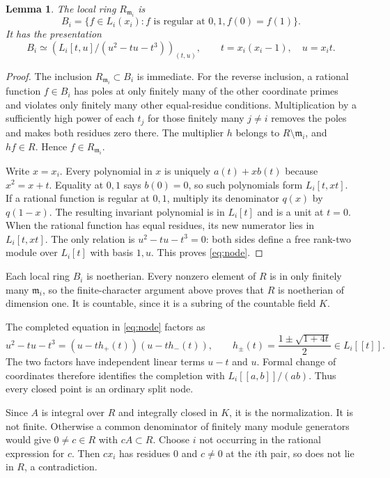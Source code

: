 \documentclass[11pt]{article}
\newtheorem{lemma}[theorem]{Lemma}
\theoremstyle{definition}\newtheorem{definition}[theorem]{Definition}
\theoremstyle{remark}\newtheorem{remark}[theorem]{Remark}
\begin{document}
\begin{lemma}\label{lem:nodal-local}
The local ring $R_{\mathfrak m_i}$ is
\[
 B_i=\{f\in L_i(x_i):f\text{ is regular at }0,1, f(0)=f(1)\}.
\]
It has the presentation
\begin{equation}\label{eq:node}
 B_i\simeq
 \left(L_i[t,u]/(u^2-tu-t^3)\right)_{(t,u)},
 \qquad t=x_i(x_i-1),\quad u=x_i t.
\end{equation}
\end{lemma}
\begin{proof}
The inclusion $R_{\mathfrak m_i}\subset B_i$ is immediate. For the reverse inclusion, a rational function $f\in B_i$ has poles at only finitely many of the other coordinate primes and violates only finitely many other equal-residue conditions. Multiplication by a sufficiently high power of each $t_j$ for those finitely many $j\ne i$ removes the poles and makes both residues zero there. The multiplier $h$ belongs to $R\setminus\mathfrak m_i$, and $hf\in R$. Hence $f\in R_{\mathfrak m_i}$.

Write $x=x_i$. Every polynomial in $x$ is uniquely $a(t)+xb(t)$ because $x^2=x+t$. Equality at $0,1$ says $b(0)=0$, so such polynomials form $L_i[t,xt]$. If a rational function is regular at $0,1$, multiply its denominator $q(x)$ by $q(1-x)$. The resulting invariant polynomial is in $L_i[t]$ and is a unit at $t=0$. When the rational function has equal residues, its new numerator lies in $L_i[t,xt]$. The only relation is $u^2-tu-t^3=0$: both sides define a free rank-two module over $L_i[t]$ with basis $1,u$. This proves \eqref{eq:node}.
\end{proof}

Each local ring $B_i$ is noetherian. Every nonzero element of $R$ is in only finitely many $\mathfrak m_i$, so the finite-character argument above proves that $R$ is noetherian of dimension one. It is countable, since it is a subring of the countable field $K$.

The completed equation in \eqref{eq:node} factors as
\[
 u^2-tu-t^3=(u-th_+(t))(u-th_-(t)),\qquad
 h_\pm(t)=\frac{1\pm\sqrt{1+4t}}2\in L_i[[t]].
\]
The two factors have independent linear terms $u-t$ and $u$. Formal change of coordinates therefore identifies the completion with $L_i[[a,b]]/(ab)$. Thus every closed point is an ordinary split node.

Since $A$ is integral over $R$ and integrally closed in $K$, it is the normalization. It is not finite. Otherwise a common denominator of finitely many module generators would give $0\ne c\in R$ with $cA\subset R$. Choose $i$ not occurring in the rational expression for $c$. Then $cx_i$ has residues $0$ and $c\ne0$ at the $i$th pair, so does not lie in $R$, a contradiction.
\end{document}
